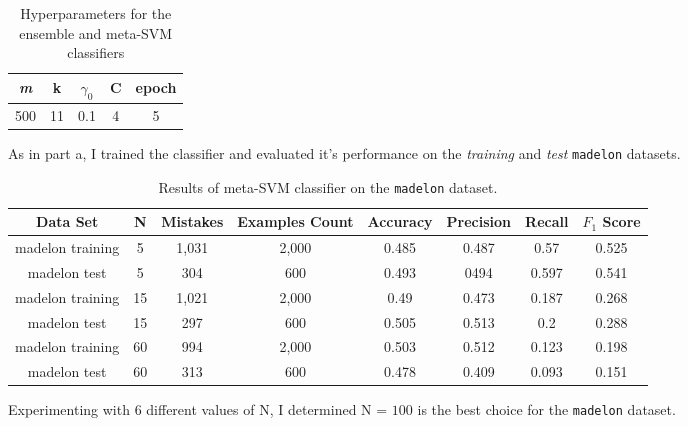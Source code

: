 \documentclass[11pt]{article}
\begin{document}
\begin{table}[H]
\centering
{\renewcommand{\arraystretch}{1.2}%
\begin{tabular}{| c | c | c | c | c |}
\hline
\textit{m} & k & $\gamma_0$ & C & epoch\\
\hline
500 & 11 & 0.1 & 4 & 5\\ \hline
\end{tabular}}
\caption{Hyperparameters for the ensemble and meta-SVM classifiers}
\end{table}

As in part a, I trained the classifier and evaluated it's performance on the \textit{training} and \textit{test} {\tt madelon} datasets.

 \begin{table}[H]
\centering
{\renewcommand{\arraystretch}{1.2}%
\begin{tabular}{| c | c | c | c | c | c | c | c |}
\hline
Data Set & N & Mistakes & Examples Count & Accuracy & Precision & Recall & $F_1$ Score\\
\hline
madelon training & 5 & 1,031 & 2,000 & 0.485 & 0.487 & 0.57 & 0.525\\ \hline
madelon test & 5 & 304 & 600 & 0.493 & 0494 & 0.597 & 0.541\\ \hline
madelon training & 15 & 1,021 & 2,000 & 0.49 & 0.473 & 0.187 & 0.268\\ \hline
madelon test & 15 & 297 & 600 & 0.505 & 0.513 & 0.2 & 0.288\\ \hline
madelon training & 60 & 994 & 2,000 & 0.503 & 0.512 & 0.123 & 0.198\\ \hline
madelon test & 60 & 313 & 600 & 0.478 & 0.409 & 0.093 & 0.151\\ \hline
\end{tabular}}
\caption{Results of meta-SVM classifier on the {\tt madelon} dataset.}
\end{table}

Experimenting with 6 different values of N, I determined N = $100$ is the best choice for the {\tt madelon} dataset.
\end{document}
